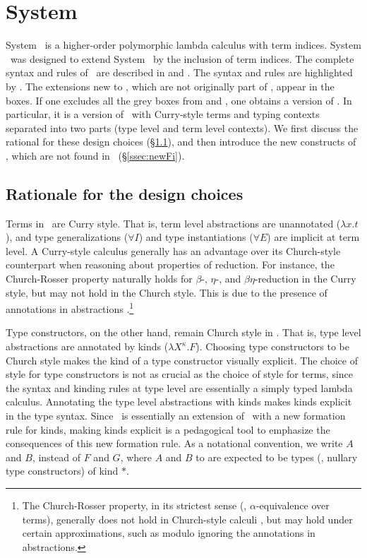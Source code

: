 \section{System \Fi}
\label{sec:Fi}
System \Fi\ is a higher-order polymorphic lambda calculus with term indices.
System \Fi\ was designed to extend System \Fw\ by the inclusion of term indices.
The complete syntax and rules of \Fi\ are described in  and
. The syntax and rules are highlighted by .
The extensions new to \Fi, which are not originally part of \Fw, appear in the boxes.
If one excludes all the grey boxes from 
and , one obtains a version of \Fw. In particular, it is a version of \Fw\
with Curry-style terms and typing contexts separated into two parts
(type level and term level contexts). We first discuss the rational for
these design choices 
(\S\ref{ssec:rationale}), and then introduce the new constructs of \Fi,
which are not found in \Fw\ (\S\ref{ssec:newFi}).

\subsection{Rationale for the design choices} \label{ssec:rationale}
Terms in \Fi\ are Curry style. That is, term level abstractions are unannotated
($\lambda x.t$), and type generalizations ($\forall I$) and type instantiations
($\forall E$) are implicit at term level. A Curry-style calculus generally has
an advantage over its Church-style counterpart when reasoning about properties of
reduction. For instance, the Church-Rosser property naturally holds for 
$\beta$-, $\eta$-, and $\beta\eta$-reduction in the Curry style, but
may not hold in the Church style. This is due to the presence of annotations in
abstractions \cite{Miquel01}.\footnote{The Church-Rosser property,
in its strictest sense (\ie, $\alpha$-equivalence over terms),
generally does not hold in Church-style calculi , but may hold under
	certain approximations, such as modulo ignoring the annotations
	in abstractions.}

Type constructors, on the other hand, remain Church style in \Fi. That is, type level abstractions are
annotated by kinds ($\lambda X^\kappa.F$). Choosing type constructors
to be Church style makes the kind of
a type constructor visually explicit. The choice of style for type constructors
is not as crucial as the choice of style for terms, since the syntax and
kinding rules at type level are essentially a simply typed lambda calculus.
Annotating the type level abstractions with kinds makes kinds
explicit in the type syntax. Since \Fi\ is essentially an extension of \Fw\
with a new formation rule for kinds, making kinds explicit is a pedagogical
tool to emphasize the consequences of this new formation rule.
As a notational convention, we write
$A$ and $B$, instead of $F$ and $G$, where $A$ and $B$ to are expected
to be types (\ie, nullary type constructors) of kind $*$.

